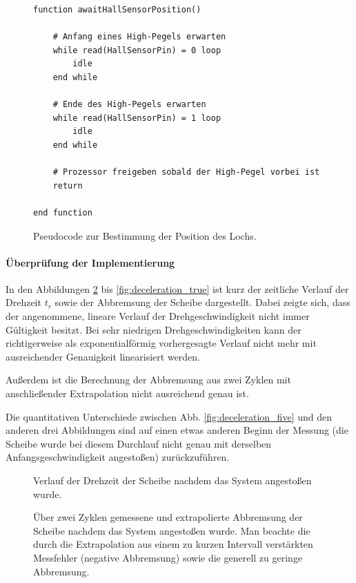 \documentclass{kis}
\begin{document}
\begin{figure}
\lstset{basicstyle=\small\ttfamily,tabsize=3}
{\singlespacing
\begin{lstlisting}[frame=single]
function awaitHallSensorPosition()

	# Anfang eines High-Pegels erwarten
	while read(HallSensorPin) = 0 loop
		idle
	end while
	
	# Ende des High-Pegels erwarten
	while read(HallSensorPin) = 1 loop
		idle
	end while
	
	# Prozessor freigeben sobald der High-Pegel vorbei ist
	return
	
end function
\end{lstlisting}
}
\caption{Pseudocode zur Bestimmung der Position des Lochs.}
\label{fig:pseudo-loch}
\end{figure}

\paragraph{Überprüfung der Implementierung}
In den Abbildungen \ref{fig:turn_time} bis \ref{fig:deceleration_true} ist kurz der zeitliche Verlauf der Drehzeit $t_r$ sowie der Abbremsung der Scheibe dargestellt. Dabei zeigte sich, dass der angenommene, lineare Verlauf der Drehgeschwindigkeit nicht immer Gültigkeit besitzt. Bei sehr niedrigen Drehgeschwindigkeiten kann der richtigerweise als exponentialförmig vorhergesagte Verlauf nicht mehr mit ausreichender Genauigkeit linearisiert werden.

Außerdem ist die Berechnung der Abbremsung aus zwei Zyklen mit anschließender Extrapolation nicht ausreichend genau ist.

Die quantitativen Unterschiede zwischen Abb. \ref{fig:deceleration_five} und den anderen drei Abbildungen sind auf einen etwas anderen Beginn der Messung (die Scheibe wurde bei diesem Durchlauf nicht genau mit derselben Anfangsgeschwindigkeit angestoßen) zurückzuführen.

\clearpage
\begin{figure}
	
	\caption[Verlauf der Drehzeit der Scheibe.]{Verlauf der Drehzeit der Scheibe nachdem das System angestoßen wurde.}
	\label{fig:turn_time}
\end{figure}

\begin{figure}
	
	\caption[Über zwei Zyklen gemessene und extrapolierte Abbremsung der Scheibe]{Über zwei Zyklen gemessene und extrapolierte Abbremsung der Scheibe nachdem das System angestoßen wurde. Man beachte die durch die Extrapolation aus einem zu kurzen Intervall verstärkten Messfehler (negative Abbremsung) sowie die generell zu geringe Abbremsung.}
	\label{fig:deceleration_two}
\end{figure}
\end{document}
